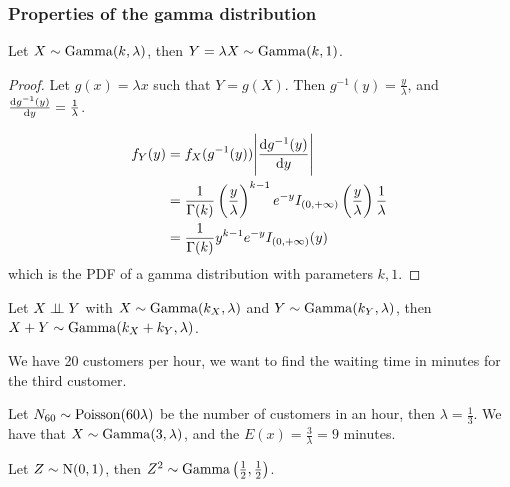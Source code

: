 \documentclass[14pt]{extarticle}
\newcommand{\Normal}{{\operatorfont N}}
\newcommand{\GammaD}{{\operatorfont Gamma}}
\newcommand{\Poisson}{{\operatorfont Poisson}}
\begin{document}
\subsubsection{Properties of the gamma distribution}

\begin{theorem}
    Let $X \sim \GammaD(k, \lambda)$, then $Y = \lambda X \sim \GammaD(k, 1)$.
\end{theorem}

\begin{proof}
    Let $g(x) = \lambda x$ such that $Y = g(X)$.
    Then $g^{-1}(y) = \frac{y}{\lambda}$, and $\dv{g^{-1}(y)}{y} = \frac{1}{\lambda}$.

    \begin{align}
        f_Y(y) & = f_X(g^{-1}(y)) \abs{\dv{g^{-1}(y)}{y}}                                                                                           \\
               & = \frac{1}{\Gamma(k)} \left(\frac{y}{\lambda}\right)^{k-1} e^{-y} I_{(0, +\infty)}\left(\frac{y}{\lambda}\right) \frac{1}{\lambda} \\
               & = \frac{1}{\Gamma(k)} y^{k-1} e^{-y} I_{(0, +\infty)}(y)                                                                           \\
    \end{align}
    which is the PDF of a gamma distribution with parameters $k, 1$.
\end{proof}

\begin{theorem}
    Let $X \perp \!\!\! \perp Y$ with $X \sim \GammaD(k_X, \lambda)$ and $Y \sim \GammaD(k_Y, \lambda)$, then $X + Y \sim \GammaD(k_X + k_Y, \lambda)$.
\end{theorem}

\begin{example}
    We have 20 customers per hour, we want to find the waiting time in minutes for the third customer.

    Let $N_{60} \sim \Poisson(60\lambda)$ be the number of customers in an hour, then $\lambda = \frac{1}{3}$.
    We have that $X \sim \GammaD(3, \lambda)$, and the $E(x) = \frac{3}{\lambda} = 9$ minutes.
\end{example}

\begin{theorem}
    Let $Z \sim \Normal(0, 1)$, then $Z^2 \sim \GammaD\left(\frac{1}{2}, \frac{1}{2}\right)$.
\end{theorem}
\end{document}

